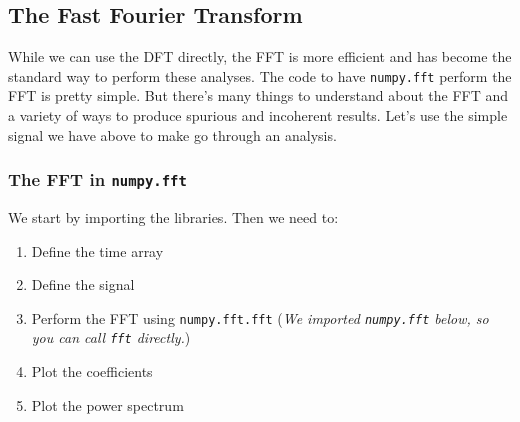 \subsection{The Fast Fourier
Transform}\label{the-fast-fourier-transform}

While we can use the DFT directly, the FFT is more efficient and has
become the standard way to perform these analyses. The code to have
\texttt{numpy.fft} perform the FFT is pretty simple. But there's many
things to understand about the FFT and a variety of ways to produce
spurious and incoherent results. Let's use the simple signal we have
above to make go through an analysis.

\subsubsection{\texorpdfstring{The FFT in
\texttt{numpy.fft}}{The FFT in numpy.fft}}\label{the-fft-in-numpy.fft}

We start by importing the libraries. Then we need to:

\begin{enumerate}
\def\labelenumi{\arabic{enumi}.}
\tightlist
\item
  Define the time array
\item
  Define the signal
\item
  Perform the FFT using \texttt{numpy.fft.fft} (\emph{We imported
  \texttt{numpy.fft} below, so you can call \texttt{fft} directly.})
\item
  Plot the coefficients
\item
  Plot the power spectrum
\end{enumerate}

\begin{Shaded}
\begin{Highlighting}[]

\OperatorTok{=}\NormalTok{(}\NormalTok{, }\NormalTok{))}

\NormalTok{)}
\NormalTok{)}
\NormalTok{)}

\end{Highlighting}
\end{Shaded}

